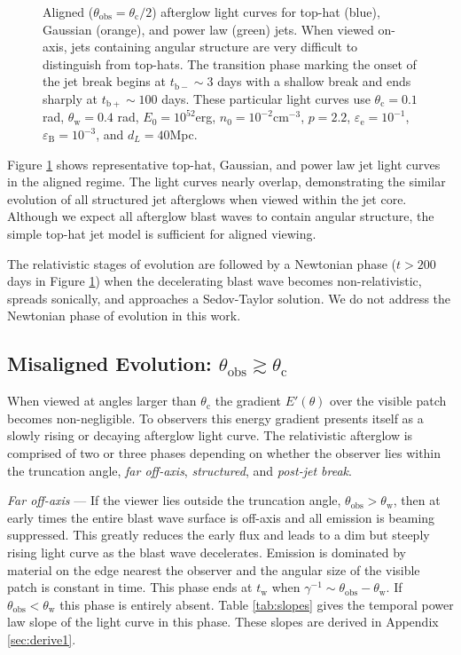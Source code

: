 \documentclass[twocolumn]{aastex62}
\newcommand{\tW}{\ensuremath{t_{\mathrm{w}}}}
\newcommand{\tbm}{\ensuremath{t_{\mathrm{b-}}}}
\newcommand{\tbp}{\ensuremath{t_{\mathrm{b+}}}}
\newcommand{\thobs}{\ensuremath{\theta_{\mathrm{obs}}}}
\newcommand{\thW}{\ensuremath{\theta_{\mathrm{w}}}}
\newcommand{\thC}{\ensuremath{\theta_{\mathrm{c}}}}
\newcommand{\epse}{\ensuremath{\varepsilon_{\mathrm{e}}}}
\newcommand{\epsB}{\ensuremath{\varepsilon_{\mathrm{B}}}}
\begin{document}
\begin{figure}
	\caption{Aligned ($\thobs = \thC/2$) afterglow light curves for top-hat (blue), Gaussian (orange), and power law (green) jets. When viewed on-axis, jets containing angular structure are very difficult to distinguish from top-hats.  The transition phase marking the onset of the jet break begins at $\tbm\sim3$ days with a shallow break and ends sharply at $\tbp \sim 100$ days.  These particular light curves use $\thC = 0.1$ rad, $\thW = 0.4$ rad, $E_0 = 10^{52}$erg, $n_0=10^{-2}$cm$^{-3}$, $p=2.2$, $\epse = 10^{-1}$, $\epsB = 10^{-3}$, and $d_L=40$Mpc. \label{fig:onaxis}}
\end{figure}

Figure \ref{fig:onaxis} shows representative top-hat, Gaussian, and power law jet light curves in the aligned regime.  The light curves nearly overlap, demonstrating the similar evolution of all structured jet afterglows when viewed within the jet core.  Although we expect all afterglow blast waves to contain angular structure, the simple top-hat jet model is sufficient for aligned viewing.

The relativistic stages of evolution are followed by a Newtonian phase ($t > 200$ days in Figure \ref{fig:onaxis}) when the decelerating blast wave becomes non-relativistic, spreads sonically, and approaches a Sedov-Taylor solution.  We do not address the Newtonian phase of evolution in this work.

\subsection{Misaligned Evolution: $\thobs \gtrsim \thC$} \label{subsec:misaligned}

When viewed at angles larger than $\thC$ the gradient $E'(\theta)$ over the visible patch becomes non-negligible.  To observers this energy gradient presents itself as a slowly rising or decaying afterglow light curve. The relativistic afterglow is comprised of two or three phases depending on whether the observer lies within the truncation angle, \emph{far off-axis}, \emph{structured}, and \emph{post-jet break}.

\emph{Far off-axis} --- If the viewer lies outside the truncation angle, $\thobs > \thW$, then at early times the entire blast wave surface is off-axis and all emission is beaming suppressed.  This greatly reduces the early flux and leads to a dim but steeply rising light curve as the blast wave decelerates.  Emission is dominated by material on the edge nearest the observer and the angular size of the visible patch is constant in time.  This phase ends at $\tW$ when $\gamma^{-1} \sim \thobs-\thW$.  If $\thobs < \thW$ this phase is entirely absent.  Table \ref{tab:slopes} gives the temporal power law slope of the light curve in this phase.  These slopes are derived in Appendix \ref{sec:derive1}.
\end{document}
